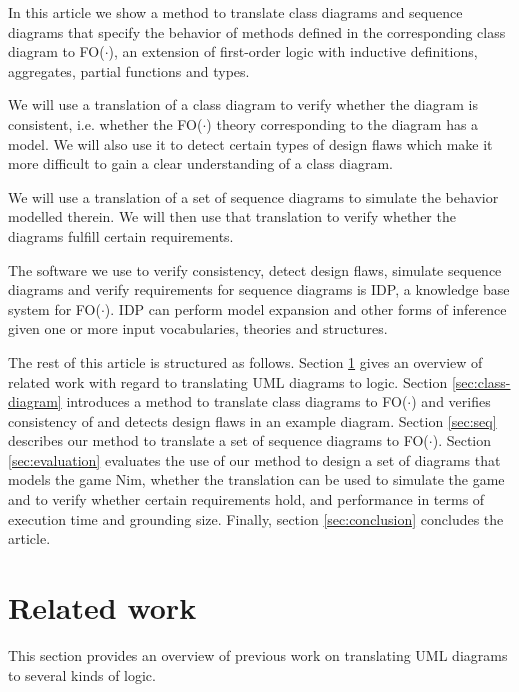 \documentclass[conference]{IEEEtran}
\begin{document}
In this article we show a method to translate class diagrams and sequence diagrams that specify the behavior of methods defined in the corresponding class diagram to FO($\cdot$)\cite{DeCatBroes2014PLaa}, an extension of first-order logic with inductive definitions, aggregates, partial functions and types.

We will use a translation of a class diagram to verify whether the diagram is consistent, i.e. whether the FO($\cdot$) theory corresponding to the diagram has a model. We will also use it to detect certain types of design flaws which make it more difficult to gain a clear understanding of a class diagram.

We will use a translation of a set of sequence diagrams to simulate the behavior modelled therein. We will then use that translation to verify whether the diagrams fulfill certain requirements.

The software we use to verify consistency, detect design flaws, simulate sequence diagrams and verify requirements for sequence diagrams is IDP\cite{DeCatBroes2014PLaa}, a knowledge base system for FO($\cdot$). IDP can perform model expansion and other forms of inference given one or more input vocabularies, theories and structures. 

The rest of this article is structured as follows. Section \ref{sec:related-work} gives an overview of related work with regard to translating UML diagrams to logic. Section \ref{sec:class-diagram} introduces a method to translate class diagrams to FO($\cdot$) and verifies consistency of and detects design flaws in an example diagram. Section \ref{sec:seq} describes our method to translate a set of sequence diagrams to FO($\cdot$). Section \ref{sec:evaluation} evaluates the use of our method to design a set of diagrams that models the game Nim, whether the translation can be used to simulate the game and to verify whether certain requirements hold, and performance in terms of execution time and grounding size. Finally, section \ref{sec:conclusion} concludes the article.

\section{Related work}\label{sec:related-work}

This section provides an overview of previous work on translating UML diagrams to several kinds of logic.
\end{document}

